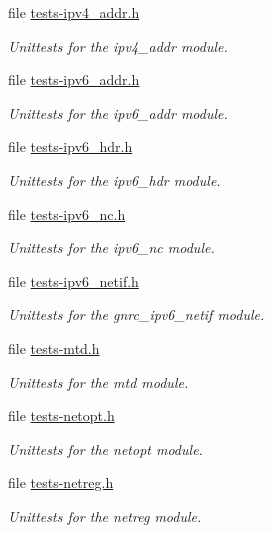 \begin{DoxyCompactItemize}
file \hyperlink{tests-ipv4__addr_8h}{tests-\/ipv4\+\_\+addr.\+h}
\begin{DoxyCompactList}\small\item\em Unittests for the {\ttfamily ipv4\+\_\+addr} module. \end{DoxyCompactList}\item 
file \hyperlink{tests-ipv6__addr_8h}{tests-\/ipv6\+\_\+addr.\+h}
\begin{DoxyCompactList}\small\item\em Unittests for the {\ttfamily ipv6\+\_\+addr} module. \end{DoxyCompactList}\item 
file \hyperlink{tests-ipv6__hdr_8h}{tests-\/ipv6\+\_\+hdr.\+h}
\begin{DoxyCompactList}\small\item\em Unittests for the {\ttfamily ipv6\+\_\+hdr} module. \end{DoxyCompactList}\item 
file \hyperlink{tests-ipv6__nc_8h}{tests-\/ipv6\+\_\+nc.\+h}
\begin{DoxyCompactList}\small\item\em Unittests for the {\ttfamily ipv6\+\_\+nc} module. \end{DoxyCompactList}\item 
file \hyperlink{tests-ipv6__netif_8h}{tests-\/ipv6\+\_\+netif.\+h}
\begin{DoxyCompactList}\small\item\em Unittests for the {\ttfamily gnrc\+\_\+ipv6\+\_\+netif} module. \end{DoxyCompactList}\item 
file \hyperlink{tests-mtd_8h}{tests-\/mtd.\+h}
\begin{DoxyCompactList}\small\item\em Unittests for the {\ttfamily mtd} module. \end{DoxyCompactList}\item 
file \hyperlink{tests-netopt_8h}{tests-\/netopt.\+h}
\begin{DoxyCompactList}\small\item\em Unittests for the {\ttfamily netopt} module. \end{DoxyCompactList}\item 
file \hyperlink{tests-netreg_8h}{tests-\/netreg.\+h}
\begin{DoxyCompactList}\small\item\em Unittests for the {\ttfamily netreg} module. \end{DoxyCompactList}\item 

\end{DoxyCompactItemize}
